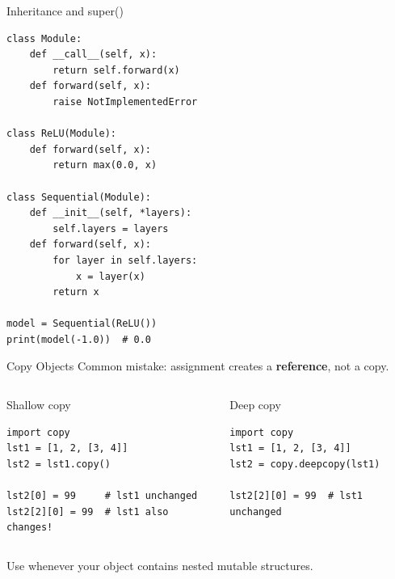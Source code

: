 \begin{frame}[fragile]{Inheritance and super()}
    \begin{lstlisting}
class Module:
    def __call__(self, x):
        return self.forward(x)
    def forward(self, x):
        raise NotImplementedError

class ReLU(Module):
    def forward(self, x):
        return max(0.0, x)

class Sequential(Module):
    def __init__(self, *layers):
        self.layers = layers
    def forward(self, x):
        for layer in self.layers:
            x = layer(x)
        return x

model = Sequential(ReLU())
print(model(-1.0))  # 0.0
    \end{lstlisting}
\end{frame}

\begin{frame}[fragile]{Copy Objects}
    \alert{Common mistake:} assignment creates a \textbf{reference}, not a copy.

    \begin{columns}[t]
    \begin{block}{Shallow copy}
    \begin{lstlisting}
import copy
lst1 = [1, 2, [3, 4]]
lst2 = lst1.copy()

lst2[0] = 99     # lst1 unchanged
lst2[2][0] = 99  # lst1 also changes!
    \end{lstlisting}
    \end{block}

    \begin{block}{Deep copy}
    \begin{lstlisting}
import copy
lst1 = [1, 2, [3, 4]]
lst2 = copy.deepcopy(lst1)

lst2[2][0] = 99  # lst1 unchanged
    \end{lstlisting}
    \end{block}
    \end{columns}

    \vspace{0.5em}
    Use  whenever your object contains nested mutable structures.
\end{frame}

